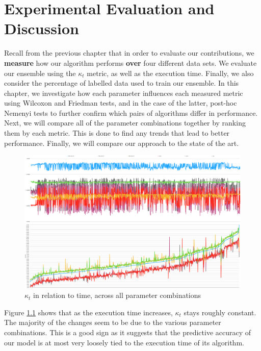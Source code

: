 
\chapter{Experimental Evaluation and Discussion\label{chapter:evaluation_discussion}} %

Recall from the previous chapter that in order to evaluate our contributions, we \textbf{measure} how our algorithm performs \textbf{over} four different data sets. We evaluate our ensemble using the $\kappa_t$ metric, as well as the execution time. Finally, we also consider the percentage of labelled data used to train our ensemble.
In this chapter, we investigate how each parameter influences each measured metric using Wilcoxon and Friedman tests, and in the case of the latter, post-hoc Nemenyi tests to further confirm which pairs of algorithms differ in performance. Next, we will compare all of the parameter combinations together by ranking them by each metric. This is done to find any trends that lead to better performance. Finally, we will compare our approach to the state of the art.

\newpage

\begin{figure}
  \includegraphics[width=\linewidth]{./images/chapter5/kappa_vs_time}
\caption{\label{fig:kappa_vs_time}$\kappa_t$ in relation to time, across all parameter combinations}
\end{figure}
Figure \ref{fig:kappa_vs_time} shows that as the execution time increases, $\kappa_t$ stays roughly constant. The majority of the changes seem to be due to the various parameter combinations. This is a good sign as it suggests that the predictive accuracy of our model is at most very loosely tied to the execution time of its algorithm.

